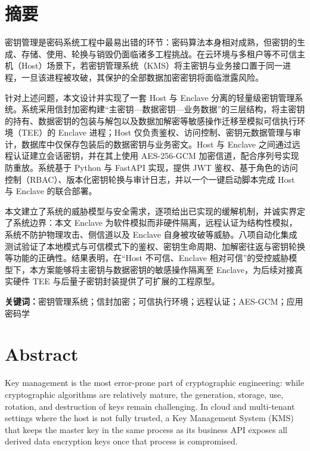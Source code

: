 \chapter*{摘要}

密钥管理是密码系统工程中最易出错的环节：密码算法本身相对成熟，但密钥的生成、存储、使用、轮换与销毁仍面临诸多工程挑战。在云环境与多租户等不可信主机（Host）场景下，若密钥管理系统（KMS）将主密钥与业务接口置于同一进程，一旦该进程被攻破，其保护的全部数据加密密钥将面临泄露风险。

针对上述问题，本文设计并实现了一套 Host 与 Enclave 分离的轻量级密钥管理系统。系统采用信封加密构建“主密钥—数据密钥—业务数据”的三层结构，将主密钥的持有、数据密钥的包装与解包以及数据加解密等敏感操作迁移至模拟可信执行环境（TEE）的 Enclave 进程；Host 仅负责鉴权、访问控制、密钥元数据管理与审计，数据库中仅保存包装后的数据密钥与业务密文。Host 与 Enclave 之间通过远程认证建立会话密钥，并在其上使用 AES-256-GCM 加密信道，配合序列号实现防重放。系统基于 Python 与 FastAPI 实现，提供 JWT 鉴权、基于角色的访问控制（RBAC）、版本化密钥轮换与审计日志，并以一个一键启动脚本完成 Host 与 Enclave 的联合部署。

本文建立了系统的威胁模型与安全需求，逐项给出已实现的缓解机制，并诚实界定了系统边界：本文 Enclave 为软件模拟而非硬件隔离，远程认证为结构性模拟，系统不防护物理攻击、侧信道以及 Enclave 自身被攻破等威胁。八项自动化集成测试验证了本地模式与可信模式下的鉴权、密钥生命周期、加解密往返与密钥轮换等功能的正确性。结果表明，在“Host 不可信、Enclave 相对可信”的受控威胁模型下，本方案能够将主密钥与数据密钥的敏感操作隔离至 Enclave，为后续对接真实硬件 TEE 与后量子密钥封装提供了可扩展的工程原型。

\vspace{1em}
\noindent\textbf{关键词：}密钥管理系统；信封加密；可信执行环境；远程认证；AES-GCM；应用密码学

\chapter*{Abstract}

Key management is the most error-prone part of cryptographic engineering: while cryptographic algorithms are relatively mature, the generation, storage, use, rotation, and destruction of keys remain challenging. In cloud and multi-tenant settings where the host is not fully trusted, a Key Management System (KMS) that keeps the master key in the same process as its business API exposes all derived data encryption keys once that process is compromised.

